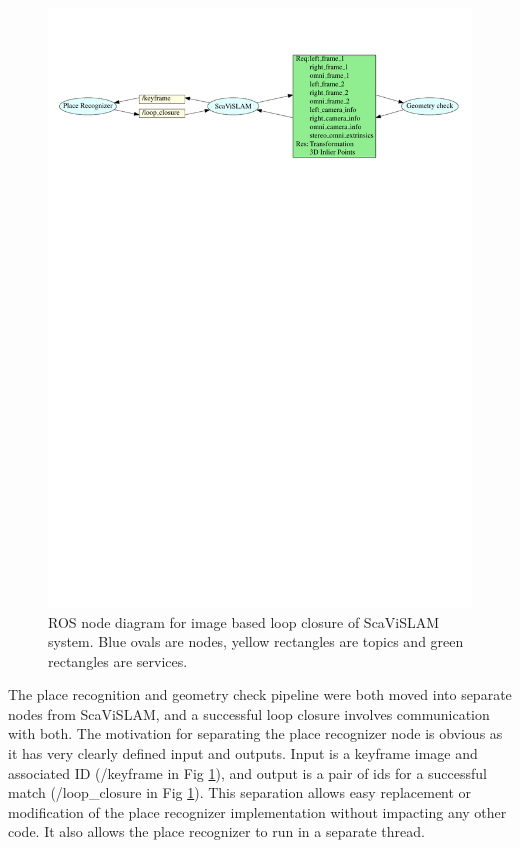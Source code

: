 \begin{figure}[h]
  \centering
    \includegraphics[width=1.0\textwidth]{chapters/images/loop_close_architecture}
  \caption{ROS node diagram for image based loop closure of ScaViSLAM system.  Blue ovals are nodes, yellow rectangles are topics and green rectangles are services.}
  \label{fig:loop_close_architecture}
\end{figure}

The place recognition and geometry check pipeline were both moved into separate nodes from ScaViSLAM, and a successful loop closure involves communication with both.  The motivation for separating the place recognizer node is obvious as it has very clearly defined input and outputs.  Input is a keyframe image and associated ID (/keyframe in Fig \ref{fig:loop_close_architecture}), and output is a pair of ids for a successful match (/loop\_closure in Fig \ref{fig:loop_close_architecture}).  This separation allows easy replacement or modification of the place recognizer implementation without impacting any other code.  It also allows the place recognizer to run in a separate thread.

